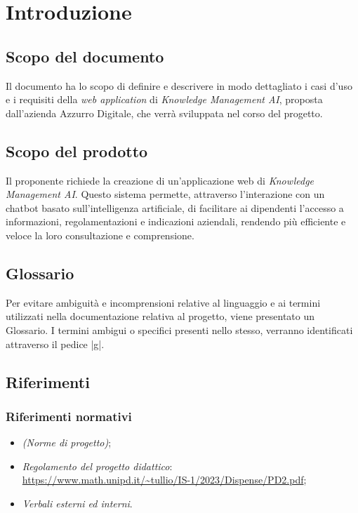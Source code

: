 \documentclass[10pt, a4paper]{article}
\title{\titolo}
\author{SWEetCode}
\begin{document}



\newpage

\tableofcontents
\newpage

\listoffigures
\newpage

\listoftables
\newpage

\section{Introduzione}
\subsection{Scopo del documento}
Il documento ha lo scopo di definire e descrivere in modo dettagliato i casi d'uso e i requisiti della \textit{web application} di \textit{Knowledge Management AI}, proposta dall'azienda Azzurro Digitale, che verrà sviluppata nel corso del progetto.
\subsection{Scopo del prodotto}
Il proponente richiede la creazione di un'applicazione web di \textit{Knowledge Management AI}. Questo sistema permette, attraverso l'interazione con un chatbot basato sull'intelligenza artificiale, di facilitare ai dipendenti l'accesso a informazioni, regolamentazioni e indicazioni aziendali, rendendo più efficiente e veloce la loro consultazione e comprensione.
\subsection{Glossario}
Per evitare ambiguità e incomprensioni relative al linguaggio e ai termini utilizzati nella documentazione relativa al progetto, viene presentato un Glossario. I termini ambigui o specifici presenti nello stesso, verranno identificati attraverso il pedice |g|.
\subsection{Riferimenti}
   \subsubsection{Riferimenti normativi}
   \begin{itemize}
    \item \textit{(Norme di progetto)};
    \item \textit{Regolamento del progetto didattico}: \\
    \href{https://www.math.unipd.it/~tullio/IS-1/2023/Dispense/PD2.pdf}{https://www.math.unipd.it/\textasciitilde tullio/IS-1/2023/Dispense/PD2.pdf};
    \item \textit{Verbali esterni ed interni}.
    \end{itemize}
    
\end{document}
